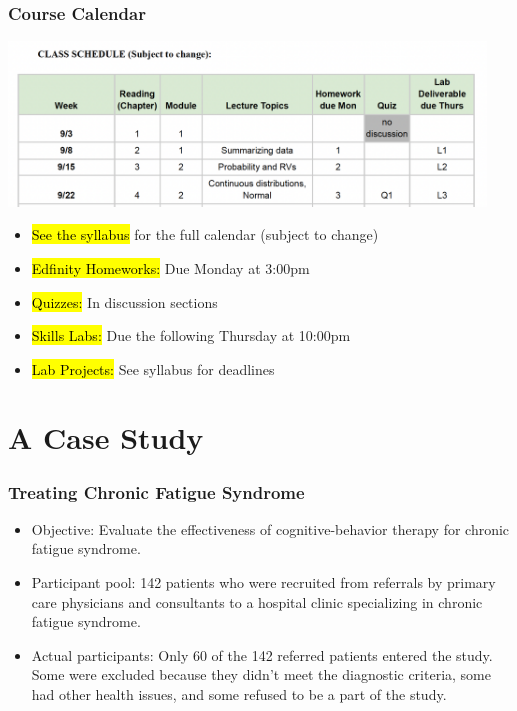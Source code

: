 \documentclass[slidestop,compress,mathserif]{beamer}
\begin{document}
\begin{frame}
	\frametitle{Course Calendar} 
    \begin{center}
        \includegraphics[width=0.95\textwidth]{2025_Calendar.png}
    \end{center}
	\begin{itemize}
		\item \hl{See the syllabus} for the full calendar (subject to change)
		\item \hl{Edfinity Homeworks:} Due Monday at 3:00pm
		\item \hl{Quizzes:} In discussion sections
		\item \hl{Skills Labs:} Due the following Thursday at 10:00pm
		\item \hl{Lab Projects:} See syllabus for deadlines
	\end{itemize}
\end{frame}

\section{A Case Study}

\begin{frame}
\frametitle{Treating Chronic Fatigue Syndrome}

\begin{itemize}

\item Objective: Evaluate the effectiveness of cognitive-behavior therapy for chronic fatigue syndrome.

\item Participant pool: 142 patients who were recruited from referrals by primary care physicians and consultants to a hospital clinic specializing in chronic fatigue syndrome.

\item Actual participants: Only 60 of the 142 referred patients entered the study. Some were excluded because they didn't meet the diagnostic criteria, some had other health issues, and some refused to be a part of the study.

\end{itemize}


\end{frame}
\end{document}
